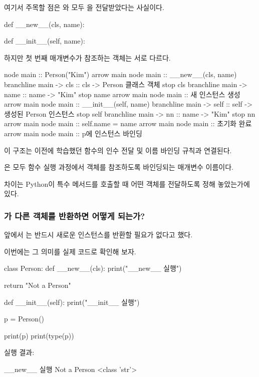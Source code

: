 여기서 주목할 점은 와  모두 을 전달받았다는 사실이다.

\begin{dhkcode}
def __new__(cls, name):

def __init__(self, name):
\end{dhkcode}

하지만 첫 번째 매개변수가 참조하는 객체는 서로 다르다.

\begin{dhkbranch}[in=8]
node main :: Person("Kim")
arrow main
node main :: __new__(cls, name)
branchline main -> cls :: cls -> Person 클래스 객체
stop cls
branchline main -> name :: name -> "Kim"
stop name
arrow main
node main :: 새 인스턴스 생성
arrow main
node main :: __init__(self, name)
branchline main -> self :: self -> 생성된 Person 인스턴스
stop self
branchline main -> nn :: name -> "Kim"
stop nn
arrow main
node main :: self.name = name
arrow main
node main :: 초기화 완료
arrow main
node main :: p에 인스턴스 바인딩
\end{dhkbranch}

이 구조는 이전에 학습했던 함수의 인수 전달 및 이름 바인딩 규칙과 연결된다.

은 모두 함수 실행 과정에서 객체를 참조하도록 바인딩되는 매개변수 이름이다.

차이는 Python이 특수 메서드를 호출할 때 어떤 객체를 전달하도록 정해 놓았는가에 있다.

\subsubsection{가 다른 객체를 반환하면 어떻게 되는가?}

앞에서 는 반드시 새로운 인스턴스를 반환할 필요가 없다고 했다.

이번에는 그 의미를 실제 코드로 확인해 보자.

\begin{dhkcode}
class Person:
    def __new__(cls):
        print("__new__ 실행")

        return "Not a Person"

    def __init__(self):
        print("__init__ 실행")


p = Person()

print(p)
print(type(p))
\end{dhkcode}

실행 결과:

\begin{dhkzsh}
__new__ 실행
Not a Person
<class 'str'>
\end{dhkzsh}


